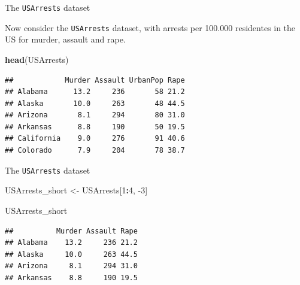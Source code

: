 \documentclass[ignorenonframetext,]{beamer}
\newenvironment{Shaded}{\begin{snugshade}}{\end{snugshade}}
\newcommand{\DecValTok}[1]{\textcolor[rgb]{0.00,0.00,0.81}{#1}}
\newcommand{\KeywordTok}[1]{\textcolor[rgb]{0.13,0.29,0.53}{\textbf{#1}}}
\newcommand{\NormalTok}[1]{#1}
\newcommand{\OperatorTok}[1]{\textcolor[rgb]{0.81,0.36,0.00}{\textbf{#1}}}
\newcommand{\StringTok}[1]{\textcolor[rgb]{0.31,0.60,0.02}{#1}}
\begin{document}
\begin{frame}[fragile]{The \texttt{USArrests} dataset}
\protect\hypertarget{the-usarrests-dataset}{}

Now consider the \texttt{USArrests} dataset, with arrests per 100.000
residentes in the US for murder, assault and rape.

\begin{Shaded}
\begin{Highlighting}[]
\KeywordTok{head}\NormalTok{(USArrests)}
\end{Highlighting}
\end{Shaded}

\begin{verbatim}
##            Murder Assault UrbanPop Rape
## Alabama      13.2     236       58 21.2
## Alaska       10.0     263       48 44.5
## Arizona       8.1     294       80 31.0
## Arkansas      8.8     190       50 19.5
## California    9.0     276       91 40.6
## Colorado      7.9     204       78 38.7
\end{verbatim}

\end{frame}

\begin{frame}[fragile]{The \texttt{USArrests} dataset}
\protect\hypertarget{the-usarrests-dataset-1}{}

\begin{Shaded}
\begin{Highlighting}[]
\NormalTok{USArrests_short <-}\StringTok{ }\NormalTok{USArrests[}\DecValTok{1}\OperatorTok{:}\DecValTok{4}\NormalTok{, }\DecValTok{-3}\NormalTok{]}
                            
\NormalTok{USArrests_short}
\end{Highlighting}
\end{Shaded}

\begin{verbatim}
##          Murder Assault Rape
## Alabama    13.2     236 21.2
## Alaska     10.0     263 44.5
## Arizona     8.1     294 31.0
## Arkansas    8.8     190 19.5
\end{verbatim}

\end{frame}
\end{document}

